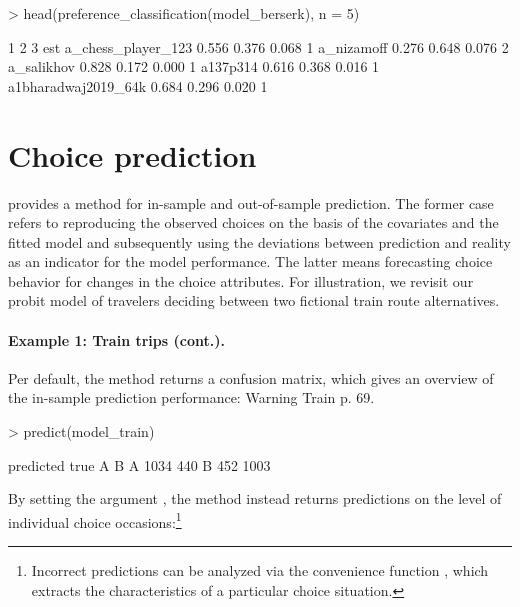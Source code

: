 \documentclass[article]{jss}
\newcommand{\fct}[1]{\code{#1()}}
\begin{document}
\begin{Schunk}
\begin{Sinput}
> head(preference_classification(model_berserk), n = 5)
\end{Sinput}
\begin{Soutput}
                        1     2     3 est
a_chess_player_123  0.556 0.376 0.068   1
a_nizamoff          0.276 0.648 0.076   2
a_salikhov          0.828 0.172 0.000   1
a137p314            0.616 0.368 0.016   1
a1bharadwaj2019_64k 0.684 0.296 0.020   1
\end{Soutput}
\end{Schunk}

\section{Choice prediction} \label{sec:choice_prediction}

 provides a \fct{predict} method for in-sample and out-of-sample prediction. The former case refers to reproducing the observed choices on the basis of the covariates and the fitted model and subsequently using the deviations between prediction and reality as an indicator for the model performance. The latter means forecasting choice behavior for changes in the choice attributes. For illustration, we revisit our probit model of travelers deciding between two fictional train route alternatives.

\paragraph{Example 1: Train trips (cont.).}

Per default, the \fct{predict} method returns a confusion matrix, which gives an overview of the in-sample prediction performance: Warning Train p. 69.

\begin{Schunk}
\begin{Sinput}
> predict(model_train)
\end{Sinput}
\begin{Soutput}
    predicted
true    A    B
   A 1034  440
   B  452 1003
\end{Soutput}
\end{Schunk}

By setting the argument , the method instead returns predictions on the level of individual choice occasions:\footnote{Incorrect predictions can be analyzed via the convenience function \fct{get\_cov}, which extracts the characteristics of a particular choice situation.}
\end{document}
